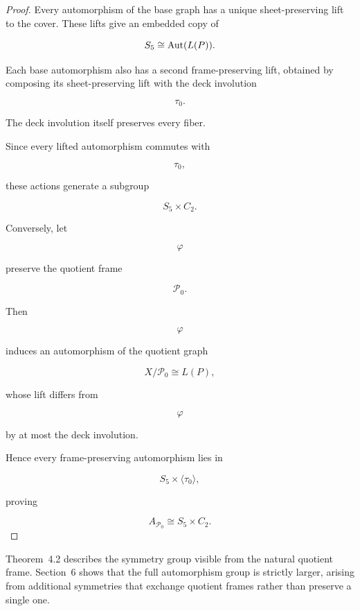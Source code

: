 \begin{proof}

Every automorphism of the base graph has a unique sheet-preserving lift
to the cover. These lifts give an embedded copy of

\[
S_{5}
\cong
\operatorname{Aut}(L(P)).
\]

Each base automorphism also has a second frame-preserving lift, obtained
by composing its sheet-preserving lift with the deck involution

\[
\tau_0.
\]

The deck involution itself preserves every fiber.

Since every lifted automorphism commutes with

\[
\tau_0,
\]

these actions generate a subgroup

\[
S_{5}\times C_{2}.
\]

Conversely, let

\[
\varphi
\]

preserve the quotient frame

\[
\mathcal P_0.
\]

Then

\[
\varphi
\]

induces an automorphism of the quotient graph

\[
X/\mathcal P_0
\cong
L(P),
\]

whose lift differs from

\[
\varphi
\]

by at most the deck involution.

Hence every frame-preserving automorphism lies in

\[
S_{5}\times\langle\tau_0\rangle,
\]

proving

\[
A_{\mathcal P_0}
\cong
S_{5}\times C_{2}.
\]

\end{proof}

Theorem~4.2 describes the symmetry group visible from the natural quotient
frame. Section~6 shows that the full automorphism group is strictly larger,
arising from additional symmetries that exchange quotient frames rather
than preserve a single one.

